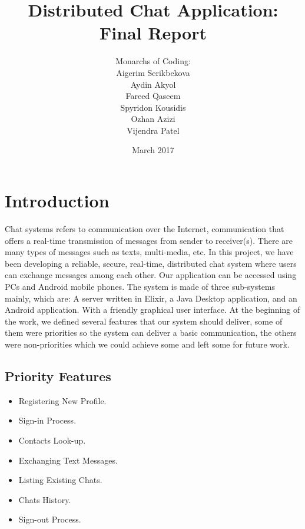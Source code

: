\documentclass[11pt,a4paper]{report}
\begin{document}
\title{Distributed Chat Application: Final Report}
\author{Monarchs of Coding:\\
  Aigerim Serikbekova\\
  Aydin Akyol\\
  Fareed Qaseem\\
  Spyridon Kousidis\\
  Ozhan Azizi\\
  Vijendra Patel}
\date{March 2017}
\maketitle

\tableofcontents


\chapter{Introduction}

Chat systems refers to communication over the Internet, communication that offers a real-time transmission of messages from sender to receiver(s). There are many types of messages such as texts, multi-media, etc. In this project, we have been developing a reliable, secure, real-time, distributed chat system where users can exchange messages among each other. Our application can be accessed using PCs and Android mobile phones.
The system is made of three sub-systems mainly, which are: A server written in Elixir, a Java Desktop application, and an Android application. With a friendly graphical user interface.
At the beginning of the work, we defined several features that our system should deliver, some of them were priorities so the system can deliver a basic communication, the others were non-priorities which we could achieve some and left some for future work.

\section{Priority Features}
	\begin{itemize}
		\item Registering New Profile.
		\item Sign-in Process.
		\item Contacts Look-up.
  		\item Exchanging Text Messages.
 		\item Listing Existing Chats.
		\item Chats History.
		\item Sign-out Process.
	\end{itemize}
\end{document}
